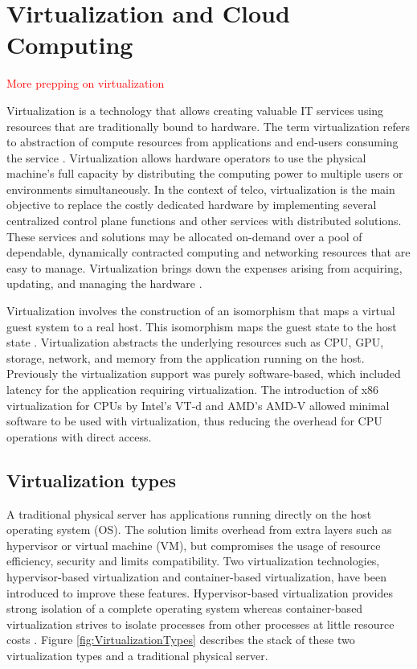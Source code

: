 \chapter{Virtualization and Cloud Computing}
\label{chapter:cloudcomputing}

\textcolor{red}{More prepping on virtualization}

Virtualization is a technology that allows creating valuable IT services using resources that are traditionally bound to hardware. The term virtualization refers to abstraction of compute resources from applications and end-users consuming the service \cite{Xing2012}. Virtualization allows hardware operators to use the physical machine's full capacity by distributing the computing power to multiple users or environments simultaneously. \cite{RedHat} In the context of telco, virtualization is the main objective to replace the costly dedicated hardware by implementing several centralized control plane functions and other services with distributed solutions. These services and solutions may be allocated on-demand over a pool of dependable, dynamically contracted computing and networking resources that are easy to manage. \cite{Bosch2011} Virtualization brings down the expenses arising from acquiring, updating, and managing the hardware \cite{Lingayat2018}\cite{Toimela2017}.

Virtualization involves the construction of an isomorphism that maps a virtual guest system to a real host. This isomorphism maps the guest state to the host state \cite{Xing2012}. Virtualization abstracts the underlying resources such as CPU, GPU, storage, network, and memory from the application running on the host. Previously the virtualization support was purely software-based, which included latency for the application requiring virtualization. The introduction of x86 virtualization for CPUs by Intel's VT-d and AMD's AMD-V allowed minimal software to be used with virtualization, thus reducing the overhead for CPU operations with direct access.

\section{Virtualization types}

A traditional physical server has applications running directly on the host operating system (OS). The solution limits overhead from extra layers such as hypervisor or virtual machine (VM), but compromises the usage of resource efficiency, security and limits compatibility. Two virtualization technologies, hypervisor-based virtualization and container-based virtualization, have been introduced to improve these features. Hypervisor-based virtualization provides strong isolation of a complete operating system whereas container-based virtualization strives to isolate processes from other processes at little resource costs \cite{Eder2016}. Figure \ref{fig:VirtualizationTypes} describes the stack of these two virtualization types and a traditional physical server.

